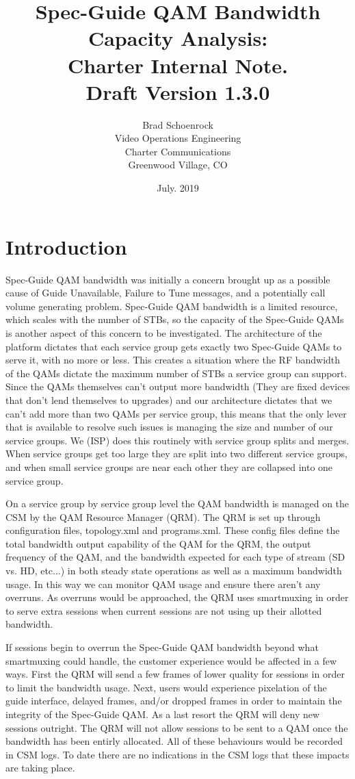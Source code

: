 \documentclass{article}
\author{Brad Schoenrock\\Video Operations Engineering\\Charter Communications\\Greenwood Village, CO}
\title{Spec-Guide QAM Bandwidth Capacity Analysis:\\Charter Internal Note.\\Draft Version 1.3.0}
\date{July. 2019}
\begin{document}
\maketitle
\newpage

\tableofcontents
\newpage

\section{Introduction}
\label{SECTION-Introduction}

Spec-Guide QAM bandwidth was initially a concern brought up as a possible cause of Guide Unavailable, Failure to Tune messages, and a potentially call volume generating problem. Spec-Guide QAM bandwidth is a limited resource, which scales with the number of STBs, so the capacity of the Spec-Guide QAMs is another aspect of this concern to be investigated. The architecture of the platform dictates that each service group gets exactly two Spec-Guide QAMs to serve it, with no more or less. This creates a situation where the RF bandwidth of the QAMs dictate the maximum number of STBs a service group can support. Since the QAMs themselves can't output more bandwidth (They are fixed devices that don't lend themselves to upgrades) and our architecture dictates that we can't add more than two QAMs per service group, this means that the only lever that is available to resolve such issues is managing the size and number of our service groups. We (ISP) does this routinely with service group splits and merges. When service groups get too large they are split into two different service groups, and when small service groups are near each other they are collapsed into one service group. 

On a service group by service group level the QAM bandwidth is managed on the CSM by the QAM Resource Manager (QRM). The QRM is set up through configuration files, topology.xml and programs.xml. These config files define the total bandwidth output capability of the QAM for the QRM, the output frequency of the QAM, and the bandwidth expected for each type of stream (SD vs. HD, etc...) in both steady state operations as well as a maximum bandwidth usage. In this way we can monitor QAM usage and ensure there aren't any overruns. As overruns would be approached, the QRM uses smartmuxing in order to serve extra sessions when current sessions are not using up their allotted bandwidth. 

If sessions begin to overrun the Spec-Guide QAM bandwidth beyond what smartmuxing could handle, the customer experience would be affected in a few ways. First the QRM will send a few frames of lower quality for sessions in order to limit the bandwidth usage. Next, users would experience pixelation of the guide interface, delayed frames, and/or dropped frames in order to maintain the integrity of the Spec-Guide QAM. As a last resort the QRM will deny new sessions outright. The QRM will not allow sessions to be sent to a QAM once the bandwidth has been entirly allocated. All of these behaviours would be recorded in CSM logs. To date there are no indications in the CSM logs that these impacts are taking place. 
\end{document}

